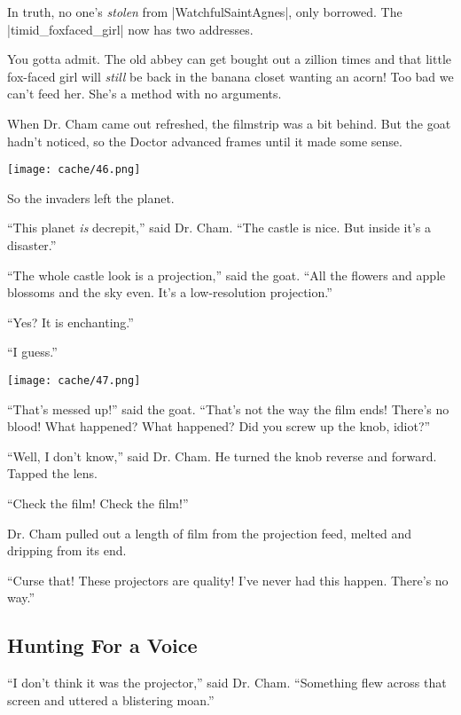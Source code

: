 \documentclass[12pt,twoside]{report}
\begin{document}
In truth, no one's {\em stolen} from
\rubyinline|WatchfulSaintAgnes|, only borrowed.  The
\rubyinline|timid_foxfaced_girl| now has two
addresses.

You gotta admit.  The old abbey can get bought out a zillion times and
that little fox-faced girl will {\em still} be back in the banana
closet wanting an acorn!  Too bad we can't feed her. She's a method
with no arguments.

When Dr. Cham came out refreshed, the filmstrip was a bit behind.  But
the goat hadn't noticed, so the Doctor advanced frames until it made
some sense.

\newpage

	\texttt{[image: cache/46.png]}

So the invaders left the planet.

``This planet {\em is} decrepit,'' said Dr. Cham.  ``The castle is
nice.  But inside it's a disaster.''

``The whole castle look is a projection,'' said the goat.  ``All the
flowers and apple blossoms and the sky even.  It's a low-resolution
projection.''

``Yes?  It is enchanting.''

``I guess.''

	\texttt{[image: cache/47.png]}

``That's messed up!'' said the goat.  ``That's not the way the film
        ends! There's no blood!  What happened?  What happened?  Did
        you screw up the knob, idiot?''

``Well, I don't know,'' said Dr. Cham.  He turned the knob reverse and
        forward. Tapped the lens.

``Check the film!  Check the film!''

Dr. Cham pulled out a length of film from the projection feed, melted
and dripping from its end.

``Curse that!  These projectors are quality!  I've never had this
happen.  There's no way.''



\subsection{Hunting For a Voice}



``I don't think it was the projector,'' said Dr. Cham.  ``Something
flew across that screen and uttered a blistering moan.''
\end{document}
